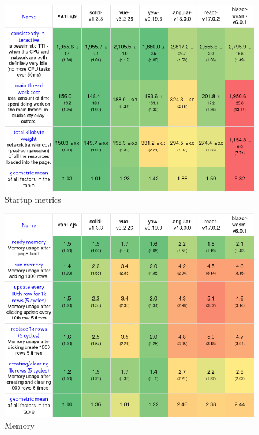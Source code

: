 \begin{figure}
  \begin{center}
    \includegraphics[width=\textwidth]{figures/benchmarks/startup_metrics.png}
  \end{center}
  \caption{Startup metrics}
  \label{fig:bench_startup}
\end{figure}

\begin{figure}
  \begin{center}
    \includegraphics[width=\textwidth]{figures/benchmarks/memory.png}
  \end{center}
  \caption{Memory}
  \label{fig:bench_memory}
\end{figure}

